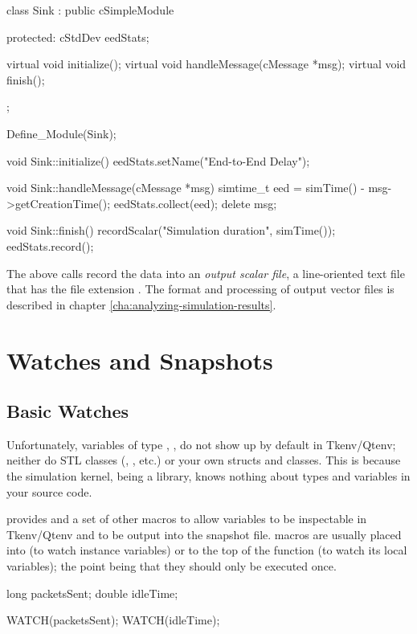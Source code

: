\begin{cpp}
class Sink : public cSimpleModule
{
  protected:
    cStdDev eedStats;

    virtual void initialize();
    virtual void handleMessage(cMessage *msg);
    virtual void finish();
};

Define_Module(Sink);

void Sink::initialize()
{
    eedStats.setName("End-to-End Delay");
}

void Sink::handleMessage(cMessage *msg)
{
    simtime_t eed = simTime() - msg->getCreationTime();
    eedStats.collect(eed);
    delete msg;
}

void Sink::finish()
{
    recordScalar("Simulation duration", simTime());
    eedStats.record();
}
\end{cpp}

The above calls record the data into an \textit{output scalar file},
a line-oriented text file that has the file extension .
The format and processing of output vector files is described in chapter
\ref{cha:analyzing-simulation-results}.



\section{Watches and Snapshots}

\subsection{Basic Watches}

Unfortunately, variables of type , , 
do not show up by default in Tkenv/Qtenv; neither do STL classes
(, , etc.) or your own structs and
classes. This is because the simulation kernel, being a library, knows
nothing about types and variables in your source code.

{\opp} provides  and a set of other macros to
allow variables to be inspectable in Tkenv/Qtenv and to be output into the snapshot
file.  macros are usually placed into
 (to watch instance variables) or to the top of the
 function (to watch its local variables); the point being
that they should only be executed once.

\begin{cpp}
long packetsSent;
double idleTime;

WATCH(packetsSent);
WATCH(idleTime);
\end{cpp}

